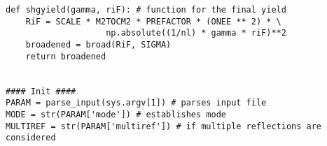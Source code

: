 \documentclass[letterpaper,10pt]{article}
\begin{document}
\begin{verbatim}
def shgyield(gamma, riF): # function for the final yield
    RiF = SCALE * M2TOCM2 * PREFACTOR * (ONEE ** 2) * \
                    np.absolute((1/nl) * gamma * riF)**2
    broadened = broad(RiF, SIGMA)
    return broadened


#### Init ####
PARAM = parse_input(sys.argv[1]) # parses input file
MODE = str(PARAM['mode']) # establishes mode
MULTIREF = str(PARAM['multiref']) # if multiple reflections are considered
\end{verbatim}
\end{document}
